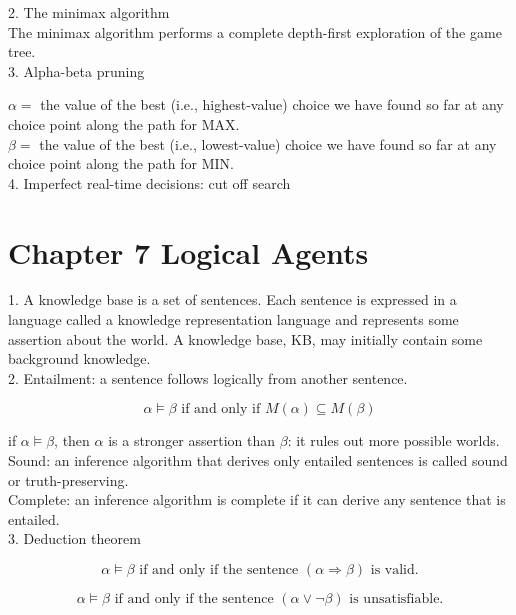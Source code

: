 \documentclass[12pt]{article}
\begin{document}
2. The minimax algorithm \\

The minimax algorithm performs a complete depth-first exploration of the game tree. \\

3. Alpha-beta pruning

$\alpha =$ the value of the best (i.e., highest-value) choice we have found so far at any choice point along the path for MAX. \\
$\beta =$ the value of the best (i.e., lowest-value) choice we have found so far at any choice point along the path for MIN. \\

4. Imperfect real-time decisions: cut off search

\section{Chapter 7 Logical Agents}

1. A knowledge base is a set of sentences. Each sentence is expressed in a language called a knowledge representation language and represents some assertion about the world. A knowledge base, KB, may initially contain some background knowledge. \\

2. Entailment: a sentence follows logically from another sentence.

\begin{equation*}
  \alpha \models \beta \text{ if and only if } M(\alpha) \subseteq M(\beta)
\end{equation*}

if $\alpha \models \beta$, then $\alpha$ is a stronger assertion than $\beta$: it rules out more possible worlds. \\

Sound: an inference algorithm that derives only entailed sentences is called sound or truth-preserving. \\

Complete: an inference algorithm is complete if it can derive any sentence that is entailed. \\

3. Deduction theorem

\begin{equation*}
  \alpha \models \beta \text{ if and only if the sentence } (\alpha \Rightarrow \beta) \text{ is valid.}
\end{equation*}

\begin{equation*}
  \alpha \models \beta \text{ if and only if the sentence } (\alpha \lor \lnot \beta) \text{ is unsatisfiable.}
\end{equation*}
\end{document}

